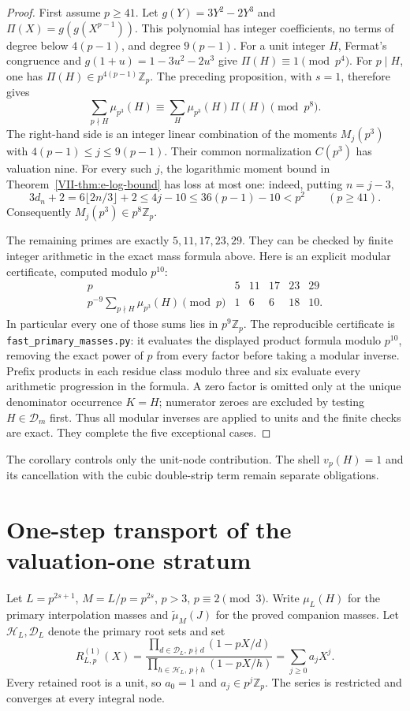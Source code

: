 \documentclass[11pt,letterpaper]{article}
\numberwithin{equation}{section}
\begin{document}
\begin{proof}
First assume $p\ge41$. Let $g(Y)=3Y^2-2Y^3$ and $\Pi(X)=g(g(X^{p-1}))$. This polynomial
has integer coefficients, no terms of degree below $4(p-1)$, and
degree $9(p-1)$. For a unit integer $H$, Fermat's congruence and
$g(1+u)=1-3u^2-2u^3$ give $\Pi(H)\equiv1\pmod{p^4}$.
For $p\mid H$, one has $\Pi(H)\in p^{4(p-1)}\mathbb Z_p$.
The preceding proposition, with $s=1$, therefore gives
\[
 \sum_{p\nmid H}\mu_{p^3}(H)
 \equiv\sum_H\mu_{p^3}(H)\Pi(H)\pmod{p^8}.
\]
The right-hand side is an integer linear combination of the moments
$M_j(p^3)$ with $4(p-1)\le j\le9(p-1)$. Their common normalization
$C(p^3)$ has valuation nine. For every such $j$, the logarithmic
moment bound in Theorem~\ref{VII-thm:e-log-bound} has loss at most one:
indeed, putting $n=j-3$,
\[
 3d_n+2=6\lfloor2n/3\rfloor+2\le4j-10
 \le36(p-1)-10<p^2 \qquad(p\ge41).
\]
Consequently $M_j(p^3)\in p^8\mathbb Z_p$.

The remaining primes are exactly $5,11,17,23,29$. They can be checked
by finite integer arithmetic in the exact mass formula above. Here is
an explicit modular certificate, computed modulo $p^{10}$:
\[
\begin{array}{c|rrrrr}
p&5&11&17&23&29\\\hline
p^{-9}\sum_{p\nmid H}\mu_{p^3}(H)\pmod p&1&6&6&18&10.
\end{array}
\]
In particular every one of those sums lies in $p^9\mathbb Z_p$.
The reproducible certificate is \nolinkurl{fast_primary_masses.py}:
it evaluates the displayed product formula modulo $p^{10}$,
removing the exact power of $p$ from every factor before taking a
modular inverse. Prefix products in each residue class modulo three
and six evaluate every arithmetic progression in the formula. A zero
factor is omitted only at the unique denominator occurrence $K=H$;
numerator zeroes are excluded by testing $H\in\mathcal D_m$ first.
Thus all modular inverses are applied to units and the finite checks
are exact. They complete the five exceptional cases.
\end{proof}

The corollary controls only the unit-node contribution. The shell
$v_p(H)=1$ and its cancellation with the cubic double-strip term
remain separate obligations.

\section{One-step transport of the valuation-one stratum}\label{loc-VII-9}
\label{VII-sec:E7one-step}
Let $L=p^{2s+1}$, $M=L/p=p^{2s}$, $p>3$, $p\equiv2\pmod3$.
Write $\mu_L(H)$ for the primary interpolation masses and
$\widetilde\mu_M(J)$ for the proved companion masses.
Let $\mathcal H_L,\mathcal D_L$ denote the primary root sets and set
\[
 R^{(1)}_{L,p}(X)=
 \frac{\prod_{d\in\mathcal D_L,\,p\nmid d}(1-pX/d)}
 {\prod_{h\in\mathcal H_L,\,p\nmid h}(1-pX/h)}
 =\sum_{j\ge0}a_jX^j.
\]
Every retained root is a unit, so $a_0=1$ and $a_j\in p^j\mathbb Z_p$.
The series is restricted and converges at every integral node.
\end{document}
